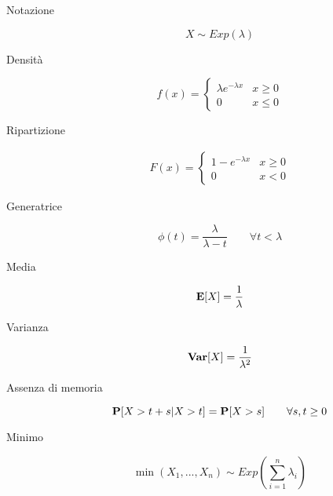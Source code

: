 \begin{description}
	
	\item [Notazione]
		\begin{equation}
		X \sim Exp(\lambda)
		\end{equation}
	
	\item [Densità]
		\begin{equation}
		f(x) = \left\{\begin{matrix}
		\lambda e^{-\lambda x} & x \geq 0\\
		0 & x \leq 0
		\end{matrix}\right.
		\end{equation}
	
	\item [Ripartizione]
		\begin{equation}
		\begin{aligned}
		F(x) =
		\left\{\begin{matrix}
		1 - e^{-\lambda x} & x \geq 0\\
		0 & x < 0
		\end{matrix}\right.
		\end{aligned}
		\end{equation}
	
	\item [Generatrice]
		\begin{equation}
		\phi(t) = \frac{\lambda}{\lambda-t} \qquad\forall t< \lambda
		\end{equation}
	
	\item [Media]
		\begin{equation}
		\mathbf{E}[X] = \frac{1}{\lambda}
		\end{equation}
	
	\item [Varianza]
		\begin{equation}
		\mathbf{Var}[X] = \frac{1}{\lambda^{2}}
		\end{equation}
	
	\item [Assenza di memoria]
		\begin{equation}
		\mathbf{P}[X>t+s | X>t]=\mathbf{P}[X>s] \qquad\forall s,t\geq 0
		\end{equation}
	
	\item [Minimo]
		\begin{equation}
		\min(X_{1},...,X_{n}) \sim Exp(\sum_{i=1}^{n}\lambda_{i})
		\end{equation}
		

\end{description}
